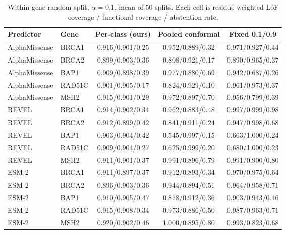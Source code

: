 \begin{table}[ht]
\centering
\caption{Within-gene random split, $\alpha=0.1$, mean of 50 splits. Each cell is residue-weighted LoF coverage /
functional coverage / abstention rate.}\label{tab:app_conformal}
\begin{tabular}{llccc}
\toprule
Predictor & Gene & Per-class (ours) & Pooled conformal & Fixed 0.1/0.9\\
\midrule
AlphaMissense & BRCA1 & 0.916/0.901/0.25 & 0.952/0.889/0.32 & 0.971/0.927/0.44 \\
AlphaMissense & BRCA2 & 0.899/0.903/0.36 & 0.808/0.921/0.17 & 0.890/0.965/0.37 \\
AlphaMissense & BAP1 & 0.909/0.898/0.39 & 0.977/0.880/0.69 & 0.942/0.687/0.26 \\
AlphaMissense & RAD51C & 0.901/0.905/0.17 & 0.824/0.929/0.10 & 0.961/0.973/0.37 \\
AlphaMissense & MSH2 & 0.915/0.901/0.29 & 0.972/0.897/0.70 & 0.956/0.799/0.39 \\
REVEL & BRCA1 & 0.914/0.902/0.34 & 0.962/0.883/0.48 & 0.997/0.999/0.98 \\
REVEL & BRCA2 & 0.912/0.899/0.42 & 0.841/0.911/0.24 & 0.947/0.998/0.68 \\
REVEL & BAP1 & 0.903/0.904/0.42 & 0.545/0.997/0.15 & 0.663/1.000/0.24 \\
REVEL & RAD51C & 0.909/0.904/0.27 & 0.625/0.999/0.20 & 0.680/1.000/0.23 \\
REVEL & MSH2 & 0.911/0.901/0.37 & 0.991/0.896/0.79 & 0.991/0.900/0.80 \\
ESM-2 & BRCA1 & 0.911/0.897/0.37 & 0.912/0.893/0.34 & 0.970/0.975/0.64 \\
ESM-2 & BRCA2 & 0.896/0.903/0.36 & 0.944/0.894/0.51 & 0.964/0.958/0.71 \\
ESM-2 & BAP1 & 0.910/0.905/0.47 & 0.878/0.912/0.36 & 0.903/0.943/0.46 \\
ESM-2 & RAD51C & 0.915/0.908/0.34 & 0.973/0.886/0.50 & 0.987/0.963/0.71 \\
ESM-2 & MSH2 & 0.920/0.902/0.46 & 1.000/0.895/0.80 & 0.993/0.823/0.68 \\
\bottomrule
\end{tabular}
\end{table}
